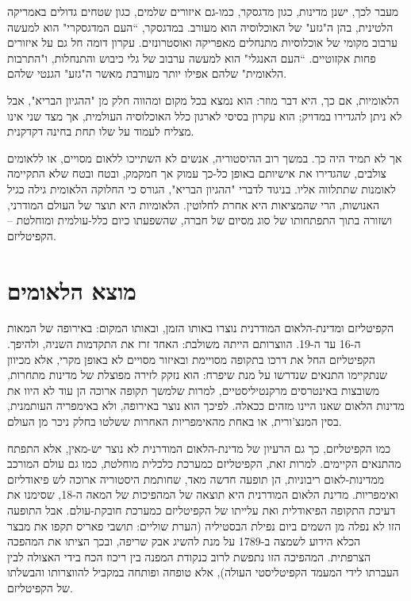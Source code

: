 מעבר לכך, ישנן מדינות, כגון מדגסקר, כמו-גם איזורים שלמים, כגון שטחים גדולים באמריקה הלטינית, בהן ה"גזע" של האוכלוסיה הוא מעורב. במדגסקר, “העם המדגסקרי" הוא למעשה ערבוב מקומי של אוכלוסיות מתנחלים מאפריקה ואוסטרונזים. עקרון דומה חל גם על איזורים פחות אקזוטיים. “העם האנגלי" הוא למעשה ערבוב של גלי כיבוש והתנחלות, ו"התרבות הלאומית" שלהם אפילו יותר מעורבת מאשר ה"גזע" הגנטי שלהם.

הלאומיות, אם כך, היא דבר מוזר: הוא נמצא בכל מקום ומהווה חלק מן "ההגיון הבריא", אבל לא ניתן להגדירו במדויק; הוא עקרון בסיסי לארגון כלל האוכלוסיה העולמית, אך מצד שני אינו מצליח לעמוד על שלו תחת בחינה דקדקנית.

אך לא תמיד היה כך. במשך רוב ההיסטוריה, אנשים לא השתייכו ללאום מסויים, או ללאומים צולבים, שהגדירו את אישיותם באופן כל-כך עמוק אך חמקמק, ובטח ובטח שלא התקיימה לאומנות שתתלווה אליו. בניגוד לדברי "ההגיון הבריא", הגורס כי החלוקה הלאומית גילה כגיל האנושות, הרי שהמציאות היא אחרת לחלוטין. הלאומיות היא תוצר של העולם המודרני, ושזורה בתוך התפתחותו של סוג מסיום של חברה, שהשפעתו כיום כלל-עולמית ומוחלטת – הקפיטליזם.



\section{מוצא הלאומים}

הקפיטליזם ומדינת-הלאום המודרנית נוצרו באותו הזמן, ובאותו המקום: באירופה של המאות ה-16 עד ה-19. הווצרותם הייתה משולבת: האחד זרז את התקדמות השניה, ולהיפך. הקפיטליזם החל את דרכו בתקופה מסויימת ובאיזור מסויים לא באופן מקרי, אלא מכיוון שנתקיימו התנאים שנדרשו על מנת שיפרח: הוא נזקק לזירה מפוצלת של מדינות מתחרות, משובצות באינטרסים מרקנטיליסטיים, למרות שלמשך תקופה ארוכה הן עוד לא היוו את מדינות הלאום שאנו היינו מזהים ככאלה. לפיכך הוא נוצר באירופה, ולא באימפריה העותמנית, בסין המנצ'ורית, או באחת מהאימפריות האחרות ששלטו בחלק ניכר מן העולם.

כמו הקפיטליזם, כך גם הרעיון של מדינת-הלאום המודרנית לא נוצר יש-מאין, אלא התפתח מהתנאים הקיימים. למרות זאת, הקפיטליזם כמערכת כלכלית מוחלטת, כמו גם עולם המורכב ממדינות-לאום ריבוניות, הן תופעה חדשה מאד, שחותמת היסטוריה ארוכה לש פיאודליזם ואימפריות. מדינת הלאום המודרנית היא תוצאה של המהפיכות של המאה ה-18, שסימנו את דעיכת התקופה הפיאודלית ואת עלייתו של הקפיטליזם כמערכת חובקת-עולם. אבל התופעה הזו לא נפלה מן השמים ביום נפילת הבסטיליה (הערת שוליים: תושבי פאריס תקפו את מבצר הכלא הידוע לשמצה ב-1789 על מנת להשיג אבק שריפה, ובכך הציתו את המהפכה הצרפתית. המהפיכה הזו נתפשת לרוב כנקודת המפנה בין ריכוז הכח בידי האצולה לבין העברתו לידי המעמד הקפיטליסטי העולה), אלא טופחה ופותחה במקביל להווצרותו והבשלתו של הקפיטליזם.

